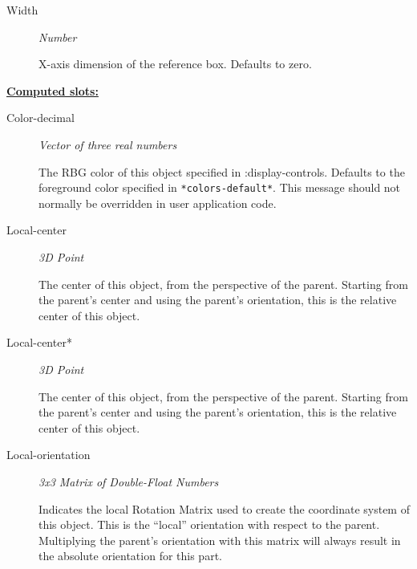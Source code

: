 \documentclass [11pt]{book}
\begin{document}
\begin{itemize}
\begin{description}
\item [Width]
\emph{Number}

 X-axis dimension of the reference box. Defaults to zero.




\end{description}






\textbf{
\underline{Computed slots:}}

\begin{description}

\item [Color-decimal]
\emph{Vector of three real numbers}

 The RBG color of this object specified in :display-controls.
Defaults to the foreground color specified in \texttt{*colors-default*}. This message should not normally be overridden in user application code.




\item [Local-center]
\emph{3D Point}

 The center of this object, from the perspective of the parent. Starting
from the parent's center and using the parent's orientation, this is the relative center
of this object.




\item [Local-center*]
\emph{3D Point}

 The center of this object, from the perspective of the parent. Starting
from the parent's center and using the parent's orientation, this is the relative center
of this object.




\item [Local-orientation]
\emph{3x3 Matrix of Double-Float Numbers}

 Indicates the local Rotation Matrix used
to create the coordinate system of this object. This is the ``local''
orientation with respect to the parent. Multiplying the parent's orientation
with this matrix will always result in the absolute orientation for this part.




\end{description}







\end{itemize}
\end{document}
